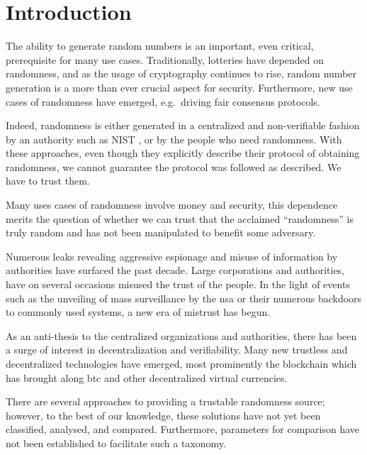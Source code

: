 \section{Introduction}\label{cha:introduction}

The ability to generate random numbers is an important, even critical, prerequisite for many use cases.
Traditionally, lotteries have depended on randomness, and as the usage of cryptography continues to rise, random number generation is a more than ever crucial aspect for security.
Furthermore, new use cases of randomness have emerged, e.g.\ driving fair consensus protocols.


Indeed, randomness is either generated in a centralized and non-verifiable fashion by an authority such as NIST , or by the people who need randomness.
With these approaches, even though they explicitly describe their protocol of obtaining randomness, we cannot guarantee the protocol was followed as described.
We have to trust them. 

Many uses cases of randomness involve money and security, this dependence merits the question of whether we can trust that the acclaimed \enquote{randomness} is truly random and has not been manipulated to benefit some adversary.

Numerous leaks revealing aggressive espionage and misuse of information by authorities have surfaced the past decade.
Large corporations and authorities, have on several occasions misused the trust of the people.
In the light of events such as the unveiling of mass surveillance by the \gls{nsa} or their numerous backdoors to commonly used systems, a new era of mistrust has begun.

As an anti-thesis to the centralized organizations and authorities, there has been a surge of interest in decentralization and verifiability.
Many new trustless and decentralized technologies have emerged, most prominently the blockchain which has brought along \gls{btc} and other decentralized virtual currencies.

There are several approaches to providing a trustable randomness source; however, to the best of our knowledge, these solutions have not yet been classified, analysed, and compared.
Furthermore, parameters for comparison have not been established to facilitate such a taxonomy.


